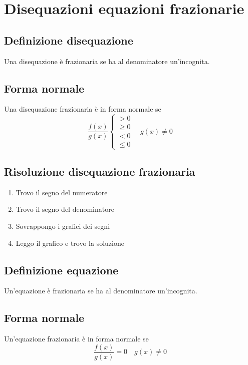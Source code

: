 \chapter{Disequazioni equazioni frazionarie}
\section{Definizione disequazione}
Una disequazione è frazionaria se ha al denominatore un'incognita.
\section{Forma normale}
Una disequazione frazionaria è in forma normale se
\begin{equation}
\dfrac{f(x)}{g(x)}\begin{cases}
>0\\
\geq 0\\
<0\\
\leq 0
\end{cases}\quad g(x)\neq 0
\end{equation}
\section{Risoluzione disequazione frazionaria}
\begin{enumerate}
	\item Trovo il segno del numeratore
	\item Trovo il segno del denominatore
	\item Sovrappongo i grafici dei segni
	\item Leggo il grafico e trovo la soluzione
\end{enumerate}
\section{Definizione equazione}
Un'equazione è frazionaria se ha al denominatore un'incognita.
\section{Forma normale}
Un'equazione frazionaria è in forma normale se
\begin{equation}
\dfrac{f(x)}{g(x)}=0\quad g(x)\neq 0
\end{equation}
